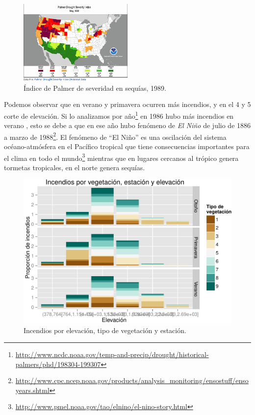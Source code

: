 \documentclass[12,]{article}
\let\rmarkdownfootnote\footnote%
\def\footnote{\protect\rmarkdownfootnote}
\begin{document}
\begin{figure}[H]
\centering
\includegraphics[width=0.5\textwidth]{imagenes/IP92.png}
\caption{Índice de Palmer de severidad en sequías, 1989.}

\end{figure}

Podemos observar que en verano y primavera ocurren más incendios, y en
el 4 y 5 corte de elevación. Si lo analizamos por año\footnote{\url{http://www.ncdc.noaa.gov/temp-and-precip/drought/historical-palmers/phd/198304-199307}}
en 1986 hubo más incendios en verano , esto se debe a que en ese año
hubo fenómeno de \emph{El Niño} de julio de 1886 a marzo de
1988\footnote{\url{http://www.cpc.ncep.noaa.gov/products/analysis_monitoring/ensostuff/ensoyears.shtml}}.
El fenómeno de ``El Niño'' es una oscilación del sistema
océano-atmósfera en el Pacífico tropical que tiene consecuencias
importantes para el clima en todo el mundo\footnote{\url{http://www.pmel.noaa.gov/tao/elnino/el-nino-story.html}}
mientras que en lugares cercanos al trópico genera tormetas tropicales,
en el norte genera sequías.

\begin{figure}[htbp]
\centering
\includegraphics{tarea2_files/figure-latex/unnamed-chunk-5-1.pdf}
\caption{Incendios por elevación, tipo de vegetación y estación.}
\end{figure}
\end{document}
